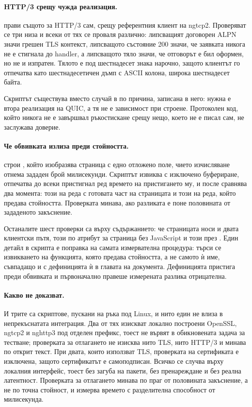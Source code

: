 \paragraph{HTTP/3 срещу чужда реализация.}  прави същото за HTTP/3
сам, срещу референтния клиент на ngtcp2. Проверяват се три низа и всеки от тях се проваля
различно: липсващият договорен ALPN значи грешен TLS контекст, липсващото състояние 200
значи, че заявката никога не е стигнала до handler, а липсващото тяло значи, че отговорът е
бил оформен, но не и изпратен. Тялото е под шестнадесет знака нарочно, защото клиентът го
отпечатва като шестнадесетичен дъмп с ASCII колона, широка шестнадесет байта.

Скриптът съществува вместо случай в  по причина, записана в него: нужна е втора
реализация на QUIC, а тя не е зависимост при строене. Протоколен код, който никога не е
завършвал ръкостискане срещу нещо, което не е писал сам, не заслужава доверие.

\paragraph{Че обвивката излиза преди стойността.}  строи
, който изобразява страница с едно отложено поле, чието изчисляване
отнема зададен брой милисекунди. Скриптът извиква  с изключено буфериране,
отпечатва до всеки пристигнал ред времето на пристигането му, и после сравнява два момента:
този на реда с готовата част на страницата и този на реда, който предава стойността.
Проверката минава, ако разликата е поне половината от зададеното закъснение.

Останалите шест проверки са върху съдържанието: че страницата носи и двата клиентски пътя,
този по атрибут за страница без JavaScript и този през . Един детайл в
скрипта е поправка на самата измервателна процедура: търси се извикването на функцията,
която предава стойността, а не самото ѝ име, съвпадащо и с дефиницията ѝ в главата на
документа. Дефиницията пристига преди обвивката и първоначално правеше измерената разлика
отрицателна.

\paragraph{Какво не доказват.} И трите са скриптове, пускани на ръка под Linux, и нито един
не влиза в непрекъснатата интеграция. Два от тях изискват локално построени OpenSSL, ngtcp2 и
nghttp3 под отделен префикс, тоест не вървят в обикновената задача за тестване; проверката за
отлагането не изисква нито TLS, нито HTTP/3 и минава по открит текст. При двата, които
използват TLS, проверката на сертификата е изключена, защото сертификатът е самоподписан. Всичко се случва върху
локалния интерфейс, тоест без загуба на пакети, без пренареждане и без реална латентност.
Проверката за отлагането минава по праг от половината закъснение, а не по точна стойност, и
измерва времето с разделителна способност от милисекунда.

